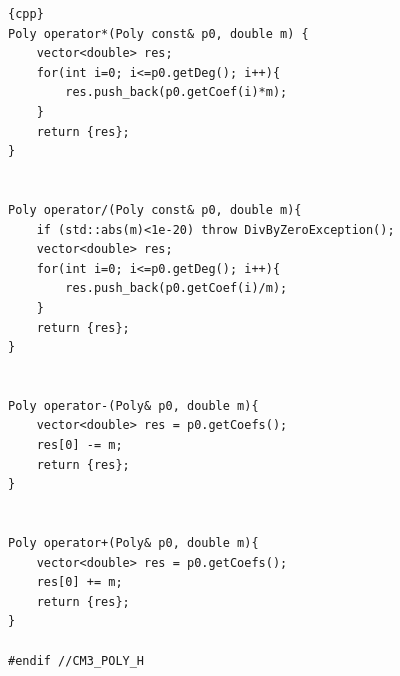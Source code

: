 \documentclass[12pt]{article}
\begin{document}
\begin{lstlisting}{cpp}
Poly operator*(Poly const& p0, double m) {
    vector<double> res;
    for(int i=0; i<=p0.getDeg(); i++){
        res.push_back(p0.getCoef(i)*m);
    }
    return {res};
}


Poly operator/(Poly const& p0, double m){
    if (std::abs(m)<1e-20) throw DivByZeroException();
    vector<double> res;
    for(int i=0; i<=p0.getDeg(); i++){
        res.push_back(p0.getCoef(i)/m);
    }
    return {res};
}


Poly operator-(Poly& p0, double m){
    vector<double> res = p0.getCoefs();
    res[0] -= m;
    return {res};
}


Poly operator+(Poly& p0, double m){
    vector<double> res = p0.getCoefs();
    res[0] += m;
    return {res};
}

#endif //CM3_POLY_H
\end{lstlisting}
\end{document}
